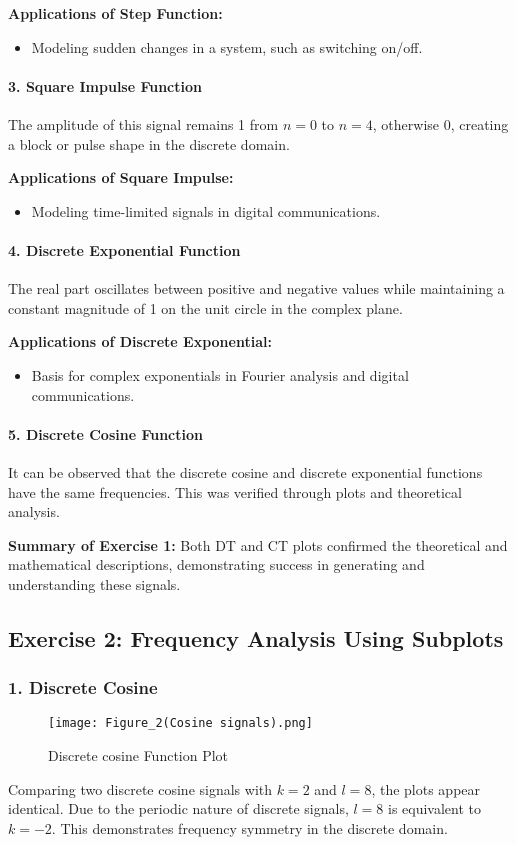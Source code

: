 \documentclass[10pt, twocolumn]{article}
\begin{document}
\textbf{Applications of Step Function:}
\begin{itemize}
    \item Modeling sudden changes in a system, such as switching on/off.
\end{itemize}

\paragraph{3. Square Impulse Function}
The amplitude of this signal remains 1 from \(n = 0\) to \(n = 4\), otherwise 0, creating a block or pulse shape in the discrete domain.

\textbf{Applications of Square Impulse:}
\begin{itemize}
    \item Modeling time-limited signals in digital communications.
\end{itemize}

\paragraph{4. Discrete Exponential Function}
The real part oscillates between positive and negative values while maintaining a constant magnitude of 1 on the unit circle in the complex plane.

\textbf{Applications of Discrete Exponential:}
\begin{itemize}
    \item Basis for complex exponentials in Fourier analysis and digital communications.
\end{itemize}

\paragraph{5. Discrete Cosine Function}
It can be observed that the discrete cosine and discrete exponential functions have the same frequencies. This was verified through plots and theoretical analysis.

\textbf{Summary of Exercise 1:}
Both DT and CT plots confirmed the theoretical and mathematical descriptions, demonstrating success in generating and understanding these signals.

\subsection{Exercise 2: Frequency Analysis Using Subplots}

\subsubsection{1. Discrete Cosine}
\begin{figure}[h]
    \centering
    \texttt{[image: Figure\_2(Cosine signals).png]}
    \caption{Discrete cosine Function Plot}
    \label{fig:Discrete cosine}
\end{figure}
Comparing two discrete cosine signals with \(k = 2\) and \(l = 8\), the plots appear identical. Due to the periodic nature of discrete signals, \(l = 8\) is equivalent to \(k = -2\). This demonstrates frequency symmetry in the discrete domain.
\end{document}
